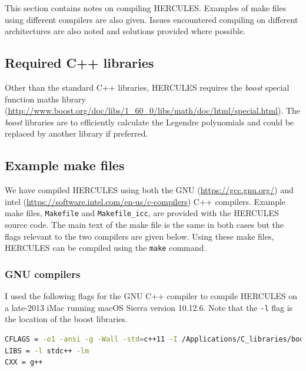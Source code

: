 \documentclass[11pt, oneside]{article}   	%
\begin{document}
This section contains notes on compiling HERCULES.
Examples of make files using different compilers are also given.
Issues encountered compiling on different architectures are also noted and solutions provided where possible.

\subsection{Required C++ libraries}

Other than the standard C++ libraries, HERCULES requires the {\it boost} special function maths library
(\url{http://www.boost.org/doc/libs/1_60_0/libs/math/doc/html/special.html}).
The {\it boost} libraries are to efficiently calculate the Legendre polynomials and could be replaced by another library if preferred. 

\subsection{Example make files}

We have compiled HERCULES using both the GNU (\url{https://gcc.gnu.org/}) and intel (\url{https://software.intel.com/en-us/c-compilers}) C++ compilers. 
Example make files, \texttt{Makefile} and \texttt{Makefile\_icc}, are provided with the HERCULES source code.
The main text of the make file is the same in both cases but the flags relevant to the two compilers are given below.
Using these make files, HERCULES can be compiled using the \texttt{make} command.

\subsubsection{GNU compilers}

I used the following flags for the GNU C++ compiler to compile HERCULES on a late-2013 iMac running macOS Sierra version 10.12.6.
Note that the \texttt{-l} flag is the location of the boost libraries. \\

\begin{lstlisting}[language=bash]
CFLAGS = -o1 -ansi -g -Wall -std=c++11 -I /Applications/C_libraries/boost_1_59_0
LIBS = -l stdc++ -lm
CXX = g++
\end{lstlisting}
\end{document}
